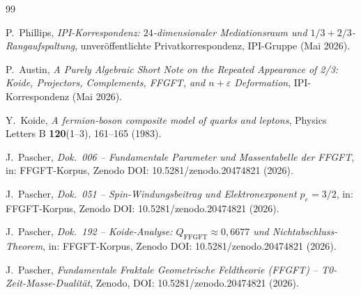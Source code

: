 \begin{thebibliography}{99}

P.~Phillips,
\textit{IPI-Korrespondenz: \(24\)-dimensionaler Mediationsraum und
\(1/3 + 2/3\)-Rangaufspaltung},
unveröffentlichte Privatkorrespondenz, IPI-Gruppe (Mai 2026).

P.~Austin,
\textit{A Purely Algebraic Short Note on the Repeated Appearance of 2/3:
Koide, Projectors, Complements, FFGFT, and \(n+\varepsilon\) Deformation},
IPI-Korrespondenz (Mai 2026).

Y.~Koide,
\textit{A fermion-boson composite model of quarks and leptons},
Physics Letters B \textbf{120}(1--3), 161--165 (1983).

J.~Pascher,
\textit{Dok.~006 -- Fundamentale Parameter und Massentabelle der FFGFT},
in: FFGFT-Korpus, Zenodo DOI: 10.5281/zenodo.20474821 (2026).

J.~Pascher,
\textit{Dok.~051 -- Spin-Windungsbeitrag und Elektronexponent \(p_e = 3/2\)},
in: FFGFT-Korpus, Zenodo DOI: 10.5281/zenodo.20474821 (2026).

J.~Pascher,
\textit{Dok.~192 -- Koide-Analyse: \(Q_{\text{FFGFT}} \approx 0{,}6677\)
und Nichtabschluss-Theorem},
in: FFGFT-Korpus, Zenodo DOI: 10.5281/zenodo.20474821 (2026).

J.~Pascher,
\textit{Fundamentale Fraktale Geometrische Feldtheorie (FFGFT) --
T0-Zeit-Masse-Dualität},
Zenodo, DOI: 10.5281/zenodo.20474821 (2026).

\end{thebibliography}
